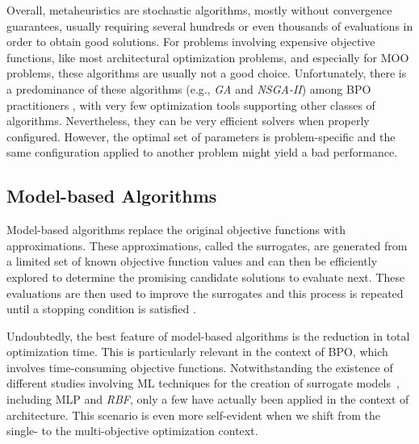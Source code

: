Overall, metaheuristics are stochastic algorithms, mostly without convergence guarantees, usually requiring several hundreds or even thousands of evaluations in order to obtain good solutions. For problems involving expensive objective functions, like most architectural optimization problems, and especially for \ac{MOO} problems, these algorithms are usually not a good choice. Unfortunately, there is a predominance of these algorithms (e.g., \textit{\ac{GA}} and \textit{\ac{NSGA-II}}) among \ac{BPO} practitioners \cite{Wortmann2017GABESTCHOICE}, with very few optimization tools supporting other classes of algorithms. Nevertheless, they can be very efficient solvers when properly configured. However, the optimal set of parameters is problem-specific and the same configuration applied to another problem might yield a bad performance.

\subsection{Model-based Algorithms}
Model-based algorithms replace the original objective functions with approximations. These approximations, called the surrogates, are generated from a limited set of known objective function values and can then be efficiently explored to determine the promising candidate solutions to evaluate next. These evaluations are then used to improve the surrogates and this process is repeated until a stopping condition is satisfied \cite{Koziel2011}. 


Undoubtedly, the best feature of model-based algorithms is the reduction in total optimization time. This is particularly relevant in the context of \ac{BPO}, which involves time-consuming objective functions. Notwithstanding the existence of different studies involving \ac{ML} techniques for the creation of surrogate models~\cite{Koziel2011}, including \ac{MLP} and \textit{\ac{RBF}}, only a few have actually been applied in the context of architecture. This scenario is even more self-evident when we shift from the single- to the multi-objective optimization context.

